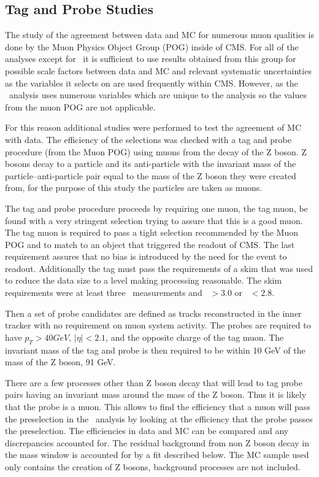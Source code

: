 \subsection{Tag and Probe Studies \label{sec:TagProbe}}
The study of the agreement between data and MC for numerous muon qualities is done by the Muon Physics Object Group (POG) inside of CMS.
For all of the analyses except for \muononly\  it is sufficient to use results obtained from this group for possible scale factors between 
data and MC and relevant systematic uncertainties as the variables it selects on are used frequently within CMS.
However, as the \muononly\ analysis uses numerous variables which are unique to the analysis so the values from the muon POG are not applicable.

For this reason additional studies were
performed to test the agreement of MC with data.
The efficiency of the selections was checked with a tag and probe procedure
(from the Muon POG) using muons from the decay of the Z boson. Z bosons decay to a particle and its anti-particle with the invariant mass of the particle--anti-particle
pair equal to the mass of the Z boson they were created from, for the purpose of this study the particles are taken as muons. 

The tag and probe procedure proceeds by
requiring one muon, the tag muon, be found with a very stringent selection trying to assure that this is a good muon. The tag muon is required to pass
a tight selection recommended by the Muon POG and to match to an object that triggered the readout of CMS. The last requirement assures that no bias is
introduced by the need for the event to readout. Additionally the tag must pass the requirements of a skim that was used to reduce the data size to a level
making processing reasonable. The skim requirements were at least three \dedx\ measurements and \ih\ $> 3.0$ or \ih\ $< 2.8$.

Then a set of probe candidates are defined as tracks reconstructed in the inner tracker with no requirement
on muon system activity. The probes are required to have $p_T > 40 GeV$, $|\eta| < 2.1$, and the opposite charge of the tag muon. The invariant mass of the tag and
probe is then required to be within 10 GeV of the mass of the Z boson, 91 GeV.

There are a few processes other than Z boson decay that will lead to tag probe pairs having an invariant mass around the mass of the Z boson. Thus it is likely that the
probe is a muon. This allows to find the efficiency that a muon will pass the preselection in the \muononly\ analysis by looking at the efficiency that the probe
passes the preselection. The efficiencies in data and MC can be compared and any discrepancies accounted for. The residual background from non Z boson decay in the
mass window is accounted for by a fit described below. The MC sample used only contains the creation of Z bosons, background processes are not included.

